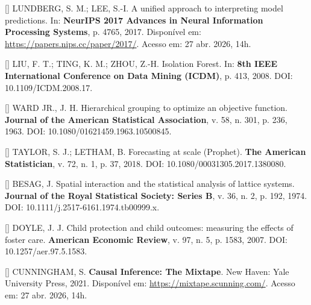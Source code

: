 \documentclass[12pt,a4paper,oneside]{article}
\begin{document}
\begin{singlespace}
\noindent\hangindent=1.25cm
[\thebibctr] LUNDBERG, S. M.; LEE, S.-I. A unified approach to interpreting
model predictions. In: \textbf{NeurIPS 2017 \textendash{} Advances
in Neural Information Processing Systems}, p. 4765,
2017. Disponível em:
\url{https://papers.nips.cc/paper/2017/}. Acesso em: 27 abr.
2026, 14h.\label{ref:lundberg}\par\smallskip

\noindent\hangindent=1.25cm
[\thebibctr] LIU, F. T.; TING, K. M.; ZHOU, Z.-H. Isolation Forest. In:
\textbf{8th IEEE International Conference on Data Mining
(ICDM)}, p. 413, 2008. DOI:
10.1109/ICDM.2008.17.\label{ref:liu}\par\smallskip

\noindent\hangindent=1.25cm
[\thebibctr] WARD JR., J. H. Hierarchical grouping to optimize an objective
function. \textbf{Journal of the American Statistical
Association}, v. 58, n. 301, p. 236, 1963. DOI:
10.1080/01621459.1963.10500845.\label{ref:ward}\par\smallskip

\noindent\hangindent=1.25cm
[\thebibctr] TAYLOR, S. J.; LETHAM, B. Forecasting at scale (Prophet).
\textbf{The American Statistician}, v. 72, n. 1, p. 37,
2018. DOI: 10.1080/00031305.2017.1380080.\label{ref:prophet}\par\smallskip

\noindent\hangindent=1.25cm
[\thebibctr] BESAG, J. Spatial interaction and the statistical analysis of
lattice systems. \textbf{Journal of the Royal Statistical Society:
Series B}, v. 36, n. 2, p. 192, 1974. DOI:
10.1111/j.2517-6161.1974.tb00999.x.\label{ref:besag}\par\smallskip

\noindent\hangindent=1.25cm
[\thebibctr] DOYLE, J. J. Child protection and child outcomes: measuring the
effects of foster care. \textbf{American Economic Review}, v. 97,
n. 5, p. 1583, 2007. DOI:
10.1257/aer.97.5.1583.\label{ref:doyle}\par\smallskip

\noindent\hangindent=1.25cm
[\thebibctr] CUNNINGHAM, S. \textbf{Causal Inference: The Mixtape}. New Haven:
Yale University Press, 2021. Disponível em:
\url{https://mixtape.scunning.com/}. Acesso em: 27 abr. 2026,
14h.\label{ref:cunningham}\par\smallskip


\end{singlespace}
\end{document}
